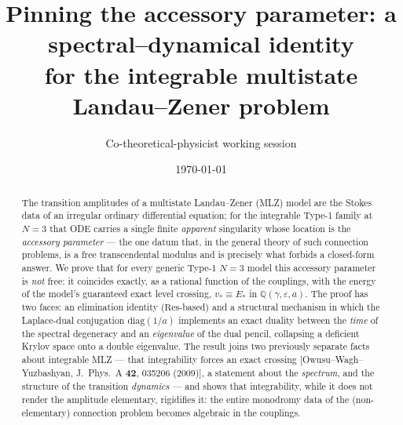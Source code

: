 \documentclass[aps,prl,reprint,nofootinbib,superscriptaddress]{revtex4-2}
\newcommand{\eps}{\varepsilon}
\newcommand{\Z}{\mathbb{Q}}
\newcommand{\diag}{\mathrm{diag}}
\newcommand{\Res}{\mathrm{Res}}
\begin{document}
\title{Pinning the accessory parameter: a spectral--dynamical identity\\
for the integrable multistate Landau--Zener problem}
\author{Co-theoretical-physicist working session}
\date{\today}

\begin{abstract}
The transition amplitudes of a multistate Landau--Zener (MLZ) model are the Stokes data of an
irregular ordinary differential equation; for the integrable Type-1 family at $N{=}3$ that ODE
carries a single finite \emph{apparent} singularity whose location is the \emph{accessory parameter}
--- the one datum that, in the general theory of such connection problems, is a free transcendental
modulus and is precisely what forbids a closed-form answer. We prove that for every generic Type-1
$N{=}3$ model this accessory parameter is \emph{not} free: it coincides exactly, as a rational
function of the couplings, with the energy of the model's guaranteed exact level crossing,
$v_*\equiv E_*$ in $\Z(\gamma,\eps,a)$. The proof has two faces: an elimination identity
($\Res$-based) and a structural mechanism in which the Laplace-dual conjugation $\diag(1/a)$
implements an exact duality between the \emph{time} of the spectral degeneracy and an
\emph{eigenvalue} of the dual pencil, collapsing a deficient Krylov space onto a double eigenvalue.
The result joins two previously separate facts about integrable MLZ --- that integrability forces an
exact crossing [Owusu--Wagh--Yuzbashyan, J.\ Phys.\ A \textbf{42}, 035206 (2009)], a statement about
the \emph{spectrum}, and the structure of the transition \emph{dynamics} --- and shows that
integrability, while it does not render the amplitude elementary, rigidifies it: the entire
monodromy data of the (non-elementary) connection problem becomes algebraic in the couplings.
\end{abstract}

\maketitle
\end{document}
